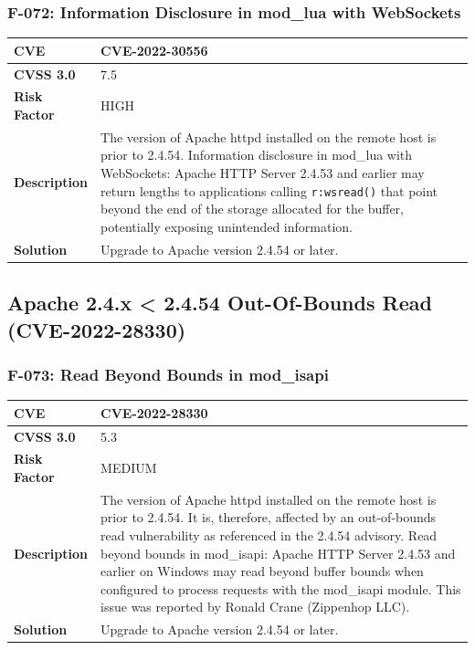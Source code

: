\subsubsection{F-072: Information Disclosure in mod\_lua with WebSockets}
\begin{tabular}{|p{2.8cm}|p{12.2cm}|}
\hline
\textbf{CVE} & CVE-2022-30556 \\ \hline
\textbf{CVSS 3.0} & 7.5 \\ \hline
\textbf{Risk Factor} & HIGH \\ \hline
\textbf{Description} & The version of Apache httpd installed on the remote host is prior to 2.4.54. Information disclosure in mod\_lua with WebSockets: Apache HTTP Server 2.4.53 and earlier may return lengths to applications calling \texttt{r:wsread()} that point beyond the end of the storage allocated for the buffer, potentially exposing unintended information. \\ \hline
\textbf{Solution} & Upgrade to Apache version 2.4.54 or later. \\ \hline
\end{tabular}

%
%
\subsection{Apache 2.4.x < 2.4.54 Out-Of-Bounds Read (CVE-2022-28330)}

\subsubsection{F-073: Read Beyond Bounds in mod\_isapi}
\begin{tabular}{|p{2.8cm}|p{12.2cm}|}
\hline
\textbf{CVE} & CVE-2022-28330 \\ \hline
\textbf{CVSS 3.0} & 5.3 \\ \hline
\textbf{Risk Factor} & MEDIUM \\ \hline
\textbf{Description} & The version of Apache httpd installed on the remote host is prior to 2.4.54. It is, therefore, affected by an out-of-bounds read vulnerability as referenced in the 2.4.54 advisory. Read beyond bounds in mod\_isapi: Apache HTTP Server 2.4.53 and earlier on Windows may read beyond buffer bounds when configured to process requests with the mod\_isapi module. This issue was reported by Ronald Crane (Zippenhop LLC). \\ \hline
\textbf{Solution} & Upgrade to Apache version 2.4.54 or later. \\ \hline
\end{tabular}

